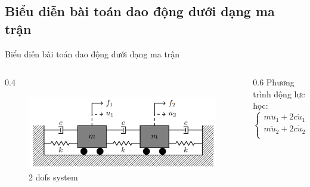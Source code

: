 \documentclass[aspectratio=169, t]{beamer} %
\begin{document}
\subsection{Biểu diễn bài toán dao động dưới dạng ma trận}
\begin{frame}{Biểu diễn bài toán dao động dưới dạng ma trận}
    \begin{columns}
        \begin{column} {0.4\textwidth}
            \vspace{-8mm}
            \begin{figure}
                \centering
                \includegraphics[width=.8\linewidth]{Slides/Figure/HeDaoDong.png}
                \caption{2 dofs system}
                \label{fig:placeholder}
            \end{figure}
        \end{column}
    
        \begin{column} {0.6\textwidth}
            \centering
            Phương trình động lực học:
            \begin{equation}\label{eq_PT2dofs_c}
                \begin{cases}
                    m \ddot{u}_1 + 2c\dot{u}_1 - c\dot{u}_2 + 2ku_1 - ku_2 = f_1 \\
                    m \ddot{u}_2 + 2c\dot{u}_2 - c\dot{u}_1 + 2ku_2 - ku_1 = f_2 \\
                \end{cases}
            \end{equation}
        \end{column}
    \end{columns}
    

\end{frame}
\end{document}
